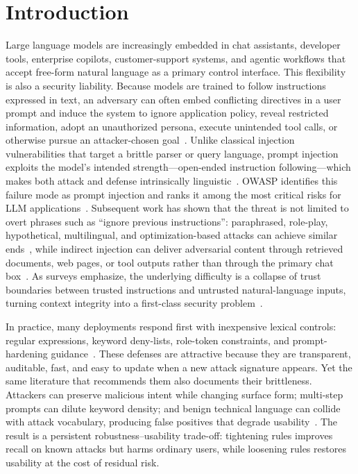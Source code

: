 
\section{Introduction}
\label{sec:introduction}

Large language models are increasingly embedded in chat assistants, developer tools, enterprise copilots, customer-support systems, and agentic workflows that accept free-form natural language as a primary control interface.
This flexibility is also a security liability.
Because models are trained to follow instructions expressed in text, an adversary can often embed conflicting directives in a user prompt and induce the system to ignore application policy, reveal restricted information, adopt an unauthorized persona, execute unintended tool calls, or otherwise pursue an attacker-chosen goal~\cite{owasp_llm,perez2022ignore,yi2024jailbreak}.
Unlike classical injection vulnerabilities that target a brittle parser or query language, prompt injection exploits the model's intended strength---open-ended instruction following---which makes both attack and defense intrinsically linguistic~\cite{11359704,bair2025prompt}.
OWASP identifies this failure mode as prompt injection and ranks it among the most critical risks for LLM applications~\cite{owasp_llm}.
Subsequent work has shown that the threat is not limited to overt phrases such as ``ignore previous instructions'': paraphrased, role-play, hypothetical, multilingual, and optimization-based attacks can achieve similar ends~\cite{yi2024jailbreak,perez2022ignore}, while indirect injection can deliver adversarial content through retrieved documents, web pages, or tool outputs rather than through the primary chat box~\cite{greshake2023indirect,hines2024spotlighting,debenedetti2024agentdojo}.
As surveys emphasize, the underlying difficulty is a collapse of trust boundaries between trusted instructions and untrusted natural-language inputs, turning context integrity into a first-class security problem~\cite{11359704,correia2026systematic,bair2025prompt}.

In practice, many deployments respond first with inexpensive lexical controls: regular expressions, keyword deny-lists, role-token constraints, and prompt-hardening guidance~\cite{openrouter2026promptinjection,getstream2024prompt,mend2024prompt}.
These defenses are attractive because they are transparent, auditable, fast, and easy to update when a new attack signature appears.
Yet the same literature that recommends them also documents their brittleness.
Attackers can preserve malicious intent while changing surface form; multi-step prompts can dilute keyword density; and benign technical language can collide with attack vocabulary, producing false positives that degrade usability~\cite{yi2024jailbreak,wang2025promptsleuth,bair2025prompt,kholkar2025capture}.
The result is a persistent robustness--usability trade-off: tightening rules improves recall on known attacks but harms ordinary users, while loosening rules restores usability at the cost of residual risk.

